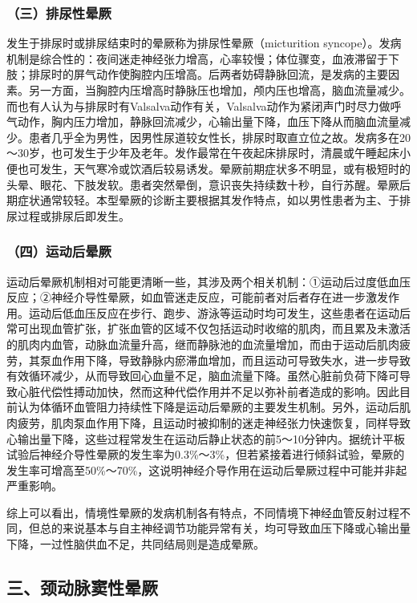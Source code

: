 \subsubsection{（三）排尿性晕厥}

发生于排尿时或排尿结束时的晕厥称为排尿性晕厥（micturition
syncope）。发病机制是综合性的：夜间迷走神经张力增高，心率较慢；体位骤变，血液滞留于下肢；排尿时的屏气动作使胸腔内压增高。后两者妨碍静脉回流，是发病的主要因素。另一方面，当胸腔内压增高时静脉压也增加，颅内压也增高，脑血流量减少。而也有人认为与排尿时有Valsalva动作有关，Valsalva动作为紧闭声门时尽力做呼气动作，胸内压力增加，静脉回流减少，心输出量下降，血压下降从而脑血流量减少。患者几乎全为男性，因男性尿道较女性长，排尿时取直立位之故。发病多在20～30岁，也可发生于少年及老年。发作最常在午夜起床排尿时，清晨或午睡起床小便也可发生，天气寒冷或饮酒后较易诱发。晕厥前期症状多不明显，或有极短时的头晕、眼花、下肢发软。患者突然晕倒，意识丧失持续数十秒，自行苏醒。晕厥后期症状通常较轻。本型晕厥的诊断主要根据其发作特点，如以男性患者为主、于排尿过程或排尿后即发生。

\subsubsection{（四）运动后晕厥}

运动后晕厥机制相对可能更清晰一些，其涉及两个相关机制：①运动后过度低血压反应；②神经介导性晕厥，如血管迷走反应，可能前者对后者存在进一步激发作用。运动后低血压反应在步行、跑步、游泳等运动时均可发生，这些患者在运动后常可出现血管扩张，扩张血管的区域不仅包括运动时收缩的肌肉，而且累及未激活的肌肉内血管，动脉血流量升高，继而静脉池的血流量增加，而由于运动后肌肉疲劳，其泵血作用下降，导致静脉内瘀滞血增加，而且运动可导致失水，进一步导致有效循环减少，从而导致回心血量不足，脑血流量下降。虽然心脏前负荷下降可导致心脏代偿性搏动加快，然而这种代偿作用并不足以弥补前者造成的影响。因此目前认为体循环血管阻力持续性下降是运动后晕厥的主要发生机制。另外，运动后肌肉疲劳，肌肉泵血作用下降，且运动时被抑制的迷走神经张力快速恢复，同样导致心输出量下降，这些过程常发生在运动后静止状态的前5～10分钟内。据统计平板试验后神经介导性晕厥的发生率为0.3\%～3\%，但若紧接着进行倾斜试验，晕厥的发生率可增高至50\%～70\%，这说明神经介导作用在运动后晕厥过程中可能并非起严重影响。

综上可以看出，情境性晕厥的发病机制各有特点，不同情境下神经血管反射过程不同，但总的来说基本与自主神经调节功能异常有关，均可导致血压下降或心输出量下降，一过性脑供血不足，共同结局则是造成晕厥。

\subsection{三、颈动脉窦性晕厥}

